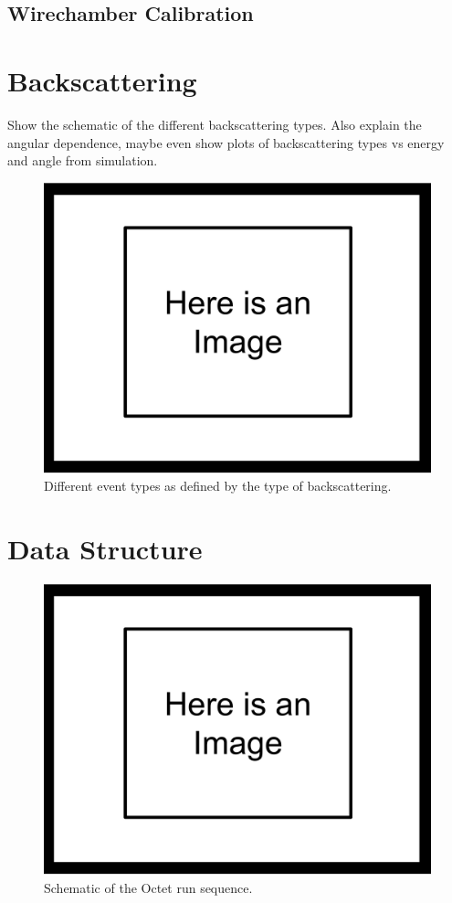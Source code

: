 \subsection{Wirechamber Calibration}

 
\section{Backscattering}

Show the schematic of the different backscattering types. Also explain the 
angular dependence, maybe even show plots of backscattering types vs energy 
and angle from simulation.

\begin{figure}[h]
\centering
\includegraphics[scale=.25]{3-UCNAAnalysis/ImageHolder.pdf}
\caption{Different event types as defined by the type of backscattering.}
\end{figure}

\section{Data Structure}

\begin{figure}[h]
\centering
\includegraphics[scale=.25]{3-UCNAAnalysis/ImageHolder.pdf}
\caption{Schematic of the Octet run sequence.}
\end{figure}

